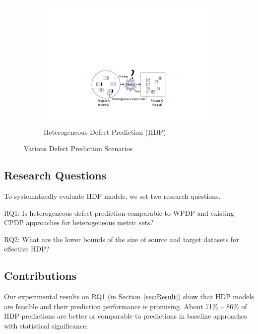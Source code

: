 \begin{figure}[t]
 \begin{subfigure}{0.8\linewidth}
 	\includegraphics[scale=0.5]{Figures/intro/p_crossdomain.pdf}
  	\caption{Heterogeneous Defect Prediction \tiny{(HDP)}}
   	\label{fig:subfig3}
 \end{subfigure}

 \label{fig:type_of_predictions}
 \caption{%
  Various Defect Prediction Scenarios
  }
\end{figure}

\subsection{Research Questions}
To systematically evaluate HDP models, we set
two research questions.
\squishlist
  \item RQ1: Is heterogeneous defect prediction comparable to WPDP and existing CPDP approaches for heterogeneous metric sets?
   \item RQ2: What are the  lower  bounds  of  the  size  of source and target  datasets  for  effective HDP?
\squishend
%

\subsection{Contributions}
Our experimental results on RQ1 (in Section~\ref{sec:Result}) show that HDP models are feasible and their prediction
performance is promising. About 71\% -- 86\% of HDP predictions
are better or comparable to predictions in baseline approaches with statistical
significance.

